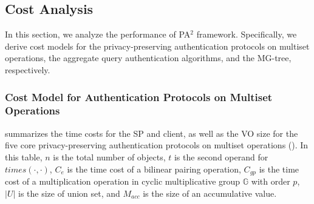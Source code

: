 \subsection{Cost Analysis}\label{sec:aggregate-queries:cost}
In this section, we analyze the performance of PA$^2$ framework. Specifically, we derive cost models for the privacy-preserving authentication protocols on multiset operations, the aggregate query authentication algorithms, and the MG-tree, respectively.

\subsubsection{Cost Model for Authentication Protocols on Multiset Operations}

\begin{table}
  \caption{Cost Models for Multiset Operations}\label{tab:aggregate-queries:cost-model-set}
\end{table}

 summarizes the time costs for the SP and client, as well as the VO size for the five core privacy-preserving authentication protocols on multiset operations (). In this table, $n$ is the total number of objects, $t$ is the second operand for $times(\cdot,\cdot)$, $C_{e}$ is the time cost of a bilinear pairing operation, $C_{gp}$ is the time cost of a multiplication operation in cyclic multiplicative group $\mathbb{G}$ with order $p$, $|U|$ is the size of union set, and $M_{acc}$ is the size of an accumulative value.


